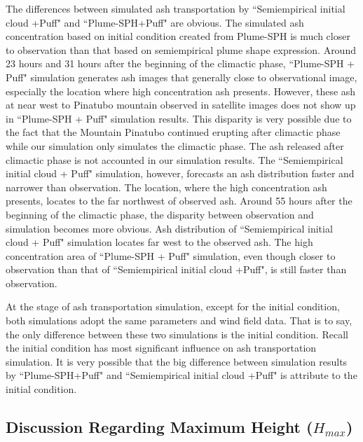 \documentclass[draft,linenumbers]{agujournal2019}
\begin{document}
\begin{figure}[!htb]
    \label{fig:Plume-SPH-Puff-ash-cloud}
\end{figure}

The differences between simulated ash transportation by ``Semiempirical initial cloud +Puff" and ``Plume-SPH+Puff" are obvious. The simulated ash concentration based on initial condition created from Plume-SPH is much closer to observation than that based on semiempirical plume shape expression. Around 23 hours and 31 hours after the beginning of the climactic phase, ``Plume-SPH + Puff" simulation generates ash images that generally close to observational image, especially the location where high concentration ash presents. However, these ash at near west to Pinatubo mountain observed in satellite images does not show up in ``Plume-SPH + Puff" simulation results. This disparity is very possible due to the fact that the Mountain Pinatubo continued erupting after climactic phase while our simulation only simulates the climactic phase. The ash released after climactic phase is not accounted in our simulation results. The ``Semiempirical initial cloud + Puff" simulation, however, forecasts an ash distribution faster and narrower than observation. The location, where the high concentration ash presents, locates to the far northwest of observed ash. 
Around 55 hours after the beginning of the climactic phase, the disparity between observation and simulation becomes more obvious. Ash distribution of ``Semiempirical initial cloud + Puff" simulation locates far west to the observed ash. The high concentration area of ``Plume-SPH + Puff" simulation, even though closer to observation than that of ``Semiempirical initial cloud +Puff", is still faster than observation.

At the stage of ash transportation simulation, except for the initial condition, both simulations adopt the same parameters and wind field data. That is to say, the only difference between these two simulations is the initial condition. Recall the initial condition has most significant influence on ash transportation simulation. It is very possible that the big difference between simulation results by ``Plume-SPH+Puff" and ``Semiempirical initial cloud +Puff" is attribute to the initial condition.

\subsection{Discussion Regarding Maximum Height ($H_{max}$)}
\end{document}
